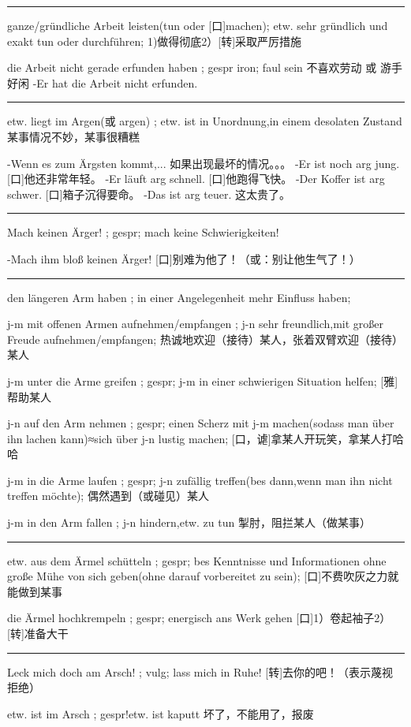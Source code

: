 \noindent\rule{\textwidth}{1pt}  
ganze/gründliche Arbeit leisten(tun oder [口]machen); etw. sehr gründlich und exakt tun oder durchführen;
1)做得彻底2）[转]采取严厉措施

die Arbeit nicht gerade erfunden haben ; gespr iron; faul sein
不喜欢劳动 或 游手好闲
-Er hat die Arbeit nicht erfunden.

\noindent\rule{\textwidth}{1pt}  
etw. liegt im Argen(或 argen) ; etw. ist in Unordnung,in einem desolaten Zustand
某事情况不妙，某事很糟糕

-Wenn es zum Ärgsten kommt,... 如果出现最坏的情况。。。
-Er ist noch arg jung. [口]他还非常年轻。
-Er läuft arg schnell. [口]他跑得飞快。
-Der Koffer ist arg schwer. [口]箱子沉得要命。
-Das ist arg teuer. 这太贵了。

\noindent\rule{\textwidth}{1pt}  
Mach keinen Ärger! ; gespr; mach keine Schwierigkeiten!

-Mach ihm bloß keinen Ärger! [口]别难为他了！（或：别让他生气了！）

\noindent\rule{\textwidth}{1pt}  
den längeren Arm haben ; in einer Angelegenheit mehr Einfluss haben;

j-m mit offenen Armen aufnehmen/empfangen ; j-n sehr freundlich,mit großer Freude aufnehmen/empfangen;
热诚地欢迎（接待）某人，张着双臂欢迎（接待）某人

j-m unter die Arme greifen ; gespr; j-m in einer schwierigen Situation helfen;
[雅]帮助某人

j-n auf den Arm nehmen ; gespr; einen Scherz mit j-m machen(sodass man über ihn lachen kann)≈sich über j-n lustig machen;
[口，谑]拿某人开玩笑，拿某人打哈哈

j-m in die Arme laufen ; gespr; j-n zufällig treffen(bes dann,wenn man ihn nicht treffen möchte);
偶然遇到（或碰见）某人

j-m in den Arm fallen ; j-n hindern,etw. zu tun
掣肘，阻拦某人（做某事）

\noindent\rule{\textwidth}{1pt}  
etw. aus dem Ärmel schütteln ; gespr; bes Kenntnisse und Informationen ohne große Mühe von sich geben(ohne darauf vorbereitet zu sein);
[口]不费吹灰之力就能做到某事

die Ärmel hochkrempeln ; gespr; energisch ans Werk gehen
[口]1）卷起袖子2）[转]准备大干

\noindent\rule{\textwidth}{1pt}  
Leck mich doch am Arsch! ; vulg; lass mich in Ruhe!
[转]去你的吧！（表示蔑视 拒绝）

etw. ist im Arsch ; gespr!etw. ist kaputt
坏了，不能用了，报废

